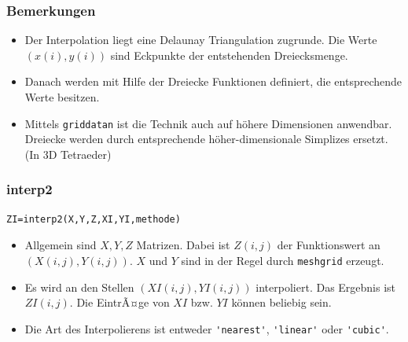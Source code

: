 %
% 
\begin{frame}[fragile]\frametitle{Bemerkungen}
\begin{itemize}
\item Der Interpolation liegt eine Delaunay Triangulation zugrunde. Die Werte
  $(x(i),y(i))$ sind Eckpunkte der entstehenden Dreiecksmenge.
\item Danach werden mit Hilfe der Dreiecke Funktionen  definiert, die
  entsprechende Werte besitzen. 
\item Mittels \lstinline!griddatan! ist die Technik auch auf h\"ohere Dimensionen
  anwendbar. Dreiecke werden durch entsprechende h\"oher-dimensionale
  Simplizes ersetzt. \\
(In 3D Tetraeder)
\end{itemize}
\end{frame}
%
% 
\begin{frame}[fragile]\frametitle{interp2}
\begin{lstlisting}
ZI=interp2(X,Y,Z,XI,YI,methode)
\end{lstlisting}
\begin{itemize}
\item Allgemein sind $X,Y,Z$ Matrizen. Dabei ist $Z(i,j)$ der Funktionswert an
  $(X(i,j),Y(i,j))$. $X$ und $Y$ sind in der Regel durch \lstinline!meshgrid! erzeugt. 
\item Es wird an den Stellen $(XI(i,j),YI(i,j))$ interpoliert. Das Ergebnis
  ist $ZI(i,j)$. Die EintrÃ¤ge von $XI$ bzw. $YI$ k\"onnen beliebig sein. 
\item Die Art des Interpolierens ist entweder \lstinline!'nearest'!, \lstinline!'linear'!
  oder \lstinline!'cubic'!. 
\end{itemize}
\end{frame}

